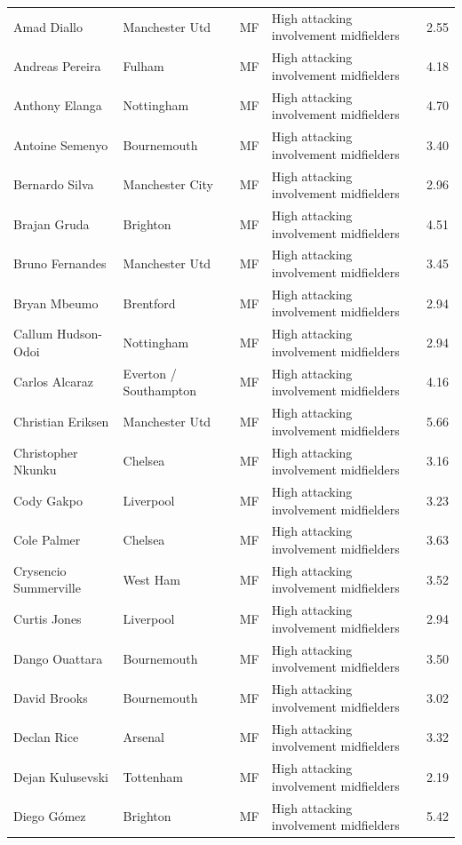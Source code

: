 \begin{longtable}{p{3.4cm}p{2.5cm}p{1.0cm}p{5.0cm}r}
Amad Diallo & Manchester Utd & MF & High attacking involvement midfielders & 2.55 \\
Andreas Pereira & Fulham & MF & High attacking involvement midfielders & 4.18 \\
Anthony Elanga & Nottingham & MF & High attacking involvement midfielders & 4.70 \\
Antoine Semenyo & Bournemouth & MF & High attacking involvement midfielders & 3.40 \\
Bernardo Silva & Manchester City & MF & High attacking involvement midfielders & 2.96 \\
Brajan Gruda & Brighton & MF & High attacking involvement midfielders & 4.51 \\
Bruno Fernandes & Manchester Utd & MF & High attacking involvement midfielders & 3.45 \\
Bryan Mbeumo & Brentford & MF & High attacking involvement midfielders & 2.94 \\
Callum Hudson-Odoi & Nottingham & MF & High attacking involvement midfielders & 2.94 \\
Carlos Alcaraz & Everton / Southampton & MF & High attacking involvement midfielders & 4.16 \\
Christian Eriksen & Manchester Utd & MF & High attacking involvement midfielders & 5.66 \\
Christopher Nkunku & Chelsea & MF & High attacking involvement midfielders & 3.16 \\
Cody Gakpo & Liverpool & MF & High attacking involvement midfielders & 3.23 \\
Cole Palmer & Chelsea & MF & High attacking involvement midfielders & 3.63 \\
Crysencio Summerville & West Ham & MF & High attacking involvement midfielders & 3.52 \\
Curtis Jones & Liverpool & MF & High attacking involvement midfielders & 2.94 \\
Dango Ouattara & Bournemouth & MF & High attacking involvement midfielders & 3.50 \\
David Brooks & Bournemouth & MF & High attacking involvement midfielders & 3.02 \\
Declan Rice & Arsenal & MF & High attacking involvement midfielders & 3.32 \\
Dejan Kulusevski & Tottenham & MF & High attacking involvement midfielders & 2.19 \\
Diego Gómez & Brighton & MF & High attacking involvement midfielders & 5.42 \\

\end{longtable}
